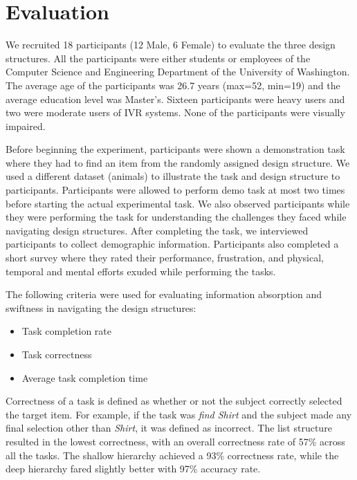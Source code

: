 \documentclass{sigchi}
\begin{document}
\section{Evaluation}
We recruited 18 participants (12 Male, 6 Female) to evaluate the three design structures. All the participants were either students or employees of the Computer Science and Engineering Department of the University of Washington. The average age of the participants was 26.7 years (max=52, min=19) and the average education level was Master's. Sixteen participants were heavy users and two were moderate users of IVR systems. None of the participants were visually impaired. 

Before beginning the experiment, participants were shown a demonstration task where they had to find an item from the randomly assigned design structure. We used a different dataset (animals) to illustrate the task and design structure to participants. Participants were allowed to perform demo task at most two times before starting the actual experimental task. We also observed participants while they were performing the task for understanding the challenges they faced while navigating design structures. After completing the task, we interviewed participants to collect demographic information. Participants also completed a short survey where they rated their performance, frustration, and physical, temporal and mental efforts exuded while performing the tasks. 

The following criteria were used for evaluating information absorption and swiftness in navigating the design structures:
\begin{itemize}
\item Task completion rate
\item Task correctness
\item Average task completion time
\end{itemize}

Correctness of a task is defined as whether or not the subject correctly selected the target item. For example, if the task was \textit{find Shirt} and the subject made any final selection other than \textit{Shirt}, it was defined as incorrect. The list structure resulted in the lowest correctness, with an overall correctness rate of 57\% across all the tasks. The shallow hierarchy achieved a 93\% correctness rate, while the deep hierarchy fared slightly better with 97\% accuracy rate.
\end{document}
